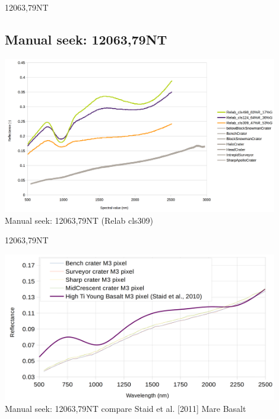 \documentclass[unknownkeysallowed,xcolor=dvipsnames,beamer]{beamer} %
\begin{document}
\begin{frame}[fragile]{12063,79NT}
\subsection{Manual seek: 12063,79NT}
\begin{center}
  \includegraphics[width=12cm]{images/fig8}\\
  Manual seek: 12063,79NT (Relab cls309)
  \end{center}
\end{frame}

\begin{frame}[fragile]{12063,79NT}
\begin{center}
  \includegraphics[width=12cm]{images/fig9}\\
  Manual seek: 12063,79NT compare Staid et al. [2011] Mare Basalt
  \end{center}
\end{frame}
\end{document}
